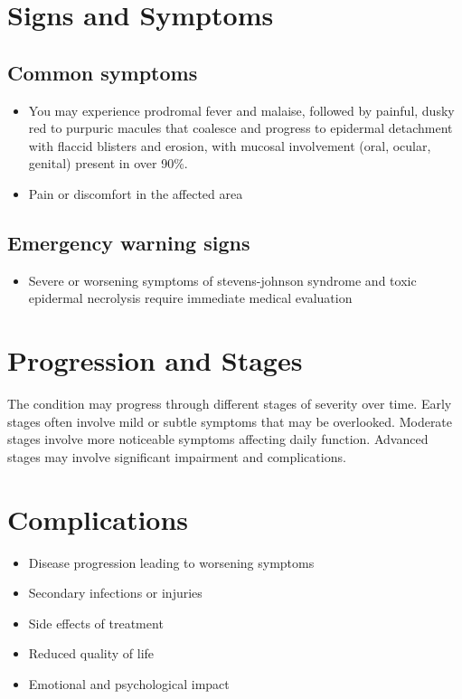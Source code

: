\section{Signs and Symptoms}

\subsection{Common symptoms}
\begin{itemize}[noitemsep]
  \item You may experience prodromal fever and malaise, followed by painful, dusky red to purpuric macules that coalesce and progress to epidermal detachment with flaccid blisters and erosion, with mucosal involvement (oral, ocular, genital) present in over 90\%.

  \item Pain or discomfort in the affected area
  \end{itemize}

\subsection{Emergency warning signs}
\begin{itemize}[noitemsep]
  \item Severe or worsening symptoms of stevens-johnson syndrome and toxic epidermal necrolysis require immediate medical evaluation
\end{itemize}
\section{Progression and Stages}
The condition may progress through different stages of severity over time. Early stages often involve mild or subtle symptoms that may be overlooked. Moderate stages involve more noticeable symptoms affecting daily function. Advanced stages may involve significant impairment and complications.
\section{Complications}
\begin{itemize}[noitemsep]
  \item Disease progression leading to worsening symptoms
  \item Secondary infections or injuries
  \item Side effects of treatment
  \item Reduced quality of life
  \item Emotional and psychological impact
\end{itemize}
